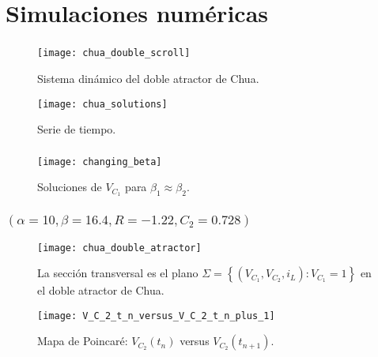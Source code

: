 \section{Simulaciones numéricas}

\begin{frame}
	\frametitle{\secname}

	\begin{minipage}{0.45\textwidth}
		\begin{figure}[ht!]
			\centering
			\texttt{[image: chua\_double\_scroll]}
			\caption{Sistema dinámico del doble atractor de Chua.}\label{fig:chua_double_scroll}
		\end{figure}
	\end{minipage}
	\begin{minipage}{0.45\textwidth}
		\begin{figure}[ht!]
			\centering
			\texttt{[image: chua\_solutions]}
			\caption{Serie de tiempo.}\label{fig:chua_solutions}
		\end{figure}
	\end{minipage}
\end{frame}

\begin{frame}
	\frametitle{\secname} %

	\begin{figure}[ht!]
		\centering
		\texttt{[image: changing\_beta]}
		\caption{Soluciones de $V_{C_{1}}$ para $\beta_{1}\approx\beta_{2}$.}\label{fig:changing_beta}
	\end{figure}

\end{frame}

\begin{frame}
	\frametitle{\secname\quad$\left(\alpha=10,\beta=16.4,R=-1.22,C_{2}=0.728\right)$}

	\begin{minipage}{0.45\textwidth}
		\begin{figure}[ht!]
			\centering
			\texttt{[image: chua\_double\_atractor]}
			\caption{La sección transversal es el plano $\Sigma=\left\{\left(V_{C_{1}},V_{C_{2}},i_{L}\right):V_{C_{1}}=1\right\}$ en el doble atractor de Chua.}\label{fig:chua_doble_atractor}
		\end{figure}
	\end{minipage}
	\begin{minipage}{0.45\textwidth}
		\begin{figure}[ht!]
			\centering
			\texttt{[image: V\_C\_2\_t\_n\_versus\_V\_C\_2\_t\_n\_plus\_1]}
			\caption{Mapa de Poincaré: $V_{C_{2}}\left(t_{n}\right)$ versus $V_{C_{2}}\left(t_{n+1}\right)$.}\label{fig:chua_solutions}
		\end{figure}
	\end{minipage}
\end{frame}

